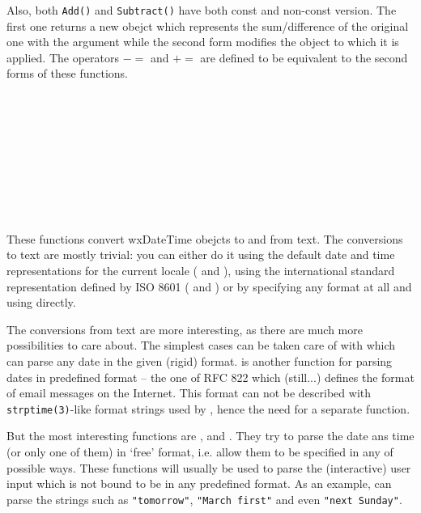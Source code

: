 Also, both {\tt Add()} and {\tt Subtract()} have both const and non-const
version. The first one returns a new obejct which represents the
sum/difference of the original one with the argument while the second form
modifies the object to which it is applied. The operators $-=$ and $+=$ are
defined to be equivalent to the second forms of these functions.

\\
\\
\\
\\
\\
\\
\\
\\


These functions convert wxDateTime obejcts to and from text. The
conversions to text are mostly trivial: you can either do it using the default
date and time representations for the current locale ( 
 and 
), using the international standard
representation defined by ISO 8601 ( 
 and 
) or by specifying any format
at all and using  directly.

The conversions from text are more interesting, as there are much more
possibilities to care about. The simplest cases can be taken care of with 
 which can parse any date in the
given (rigid) format.  is
another function for parsing dates in predefined format -- the one of RFC 822
which (still...) defines the format of email messages on the Internet. This
format can not be described with {\tt strptime(3)}-like format strings used by 
, hence the need for a separate function.

But the most interesting functions are 
, 
 and 
. They try to parse the date
ans time (or only one of them) in `free' format, i.e. allow them to be
specified in any of possible ways. These functions will usually be used to
parse the (interactive) user input which is not bound to be in any predefined
format. As an example,  can
parse the strings such as {\tt "tomorrow"}, {\tt "March first"} and even 
{\tt "next Sunday"}.


